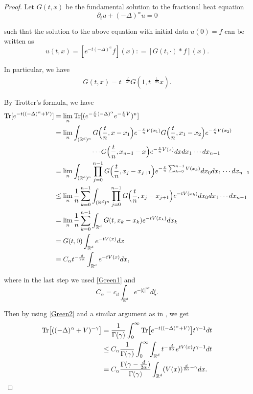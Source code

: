 \documentclass[%
11pt,  reqno]{amsart}
\theoremstyle{remarkstyle}
\newcommand{\1}{\hspace{0.2mm}\text{I}\hspace{0.2mm}}
\newcommand{\noi}{\noindent}
\newcommand{\R}{\mathbb{R}}
\newcommand{\al}{\alpha}
\newcommand{\g}{\gamma}
\newcommand{\G}{\Gamma}
\numberwithin{equation}{section}
\numberwithin{theorem}{section}
\begin{document}
	
	\begin{proof}
		Let $G(t,x)$ be the fundamental solution to the fractional heat equation
		\[
		\partial_t u +(-\Delta)^\al u = 0 
		\]
		
		\noi 
		such that the solution to the above equation with initial data $u(0) = f$ can be written as
		\[
		u(t,x) = [e^{-t(-\Delta)^\al} f](x) : = [G(t,\cdot) \ast f](x).
		\]
		
		\noi 
		In particular, we have
		\begin{align}
			\label{Green1}
			G(t,x) = t^{-\frac{d}{2\al}} G(1,t^{-\frac{1}{2\al}} x).
		\end{align}
		
		By Trotter's formula, we have
		\begin{align}
			\begin{split}
				{\rm Tr} [e^{-t ((-\Delta)^\al +V)}] & = \lim_n {\rm Tr} [(e^{-\frac{t}n (-\Delta)^\al}e^{-\frac{t}n V})^n] \\
				& = \lim_n  \int_{(\R^{d})^n} G\Big(\frac{t}n,x-x_1\Big) e^{-\frac{t}n V(x_1)} G\Big(\frac{t}n,x_1-x_2\Big) e^{-\frac{t}n V(x_2)} \\
				& \hphantom{XXXXXX}  \cdots G\Big(\frac{t}n,x_{n-1}-x\Big) e^{-\frac{t}n V(x )}dx dx_1 \cdots dx_{n-1} \\
				& = \lim_n  \int_{(\R^{d})^n} \prod_{j=0}^{n-1} G\Big(\frac{t}n,x_j-x_{j+1}\Big) e^{-\frac{t}n \sum_{k=0}^{n-1} V(x_k)} dx_0 dx_1 \cdots dx_{n-1} \\
				& \le \lim_n  \frac1n  \sum_{k=0}^{n-1} \int_{(\R^{d})^n} \prod_{j=0}^{n-1} G\Big(\frac{t}n,x_j-x_{j+1}\Big) e^{- t V(x_k)} dx_0 dx_1 \cdots dx_{n-1}\\
				& = \lim_n  \frac1n  \sum_{k=0}^{n-1} \int_{\R^d} G(t, x_k - x_k) e^{- t V(x_k)} dx_k \\
				& = G(t, 0) \int_{\R^d}  e^{- t V(x )} dx \\
				& = C_{\al} t^{-\frac{d}{2\al}} \int_{\R^d}  e^{- t V(x )} dx,
			\end{split}
			\label{Green2}
		\end{align}
		
		\noi 
		where in the last step we used \eqref{Green1} and 
		\[
		C_\al = c_d \int_{\R^d} e^{-|\xi|^{2\al}} d\xi.
		\]
		
		Then by using \eqref{Green2} and a similar argument as in \cite{DFLP06}, we get
		\begin{align}
			\begin{split}
				{\rm Tr } \big[ ((-\Delta)^\al + V)^{-\g} \big] & = \frac1{\Gamma (\g)} \int_0^\infty {\rm Tr} \big[ e^{-t ((-\Delta)^\al +V)} \big] t^{\g - 1} dt \\
				& \le C_\al \frac1{\Gamma (\g)} \int_0^\infty \int_{\R^d}  t^{-\frac{d}{2\al}} e^{tV(x)} t^{\g - 1} dt\\
				& = C_\al \frac{\G(\g - \frac{d}{2\al})}{\G(\g)}
				\int_{\R^d} ( V(x))^{\frac{d}{2\al} - \g} dx.
			\end{split}
		\end{align}
		

\end{proof}
\end{document}
